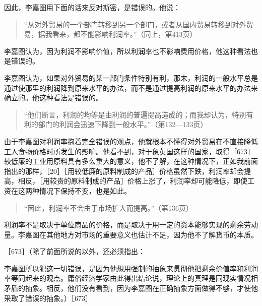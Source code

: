 因此，李嘉图用下面的话来反对斯密，是错误的。他说：

\begin{quote}{“从对外贸易的一个部门转移到另一个部门，或者从国内贸易转移到对外贸易，据我看来，都不能影响利润率。”（同上，第413页）}\end{quote}

李嘉图认为，因为利润不影响价值，所以利润率也不影响费用价格，他这种看法也是错误的。

李嘉图认为，如果对外贸易的某一部门条件特别有利，那末，利润的一般水平总是通过使那里的利润降到原来水平的办法，而不是通过提高利润的原来水平的办法来确立的。他这种看法是错误的。

\begin{quote}{“他们断言，利润的均等是由利润的普遍提高造成的；而我却认为，特别有利的部门的利润会迅速下降到一般水平。”（第132—133页）}\end{quote}

由于李嘉图对利润率抱着完全错误的观点，他就根本不懂得对外贸易在不直接降低工人食物价格时所发生的影响。他看不到，对于象英国这样的国家，取得［673］较低廉的工业用原料具有多么重大的意义，他不了解，在这种情况下，正如我前面指出的那样，［20］［用较低廉的原料制成的产品］价格虽然下跌，利润率却会提高，相反，［用较贵的原料制成的产品］价格上涨了，利润率却可能降低，即使工资在这两种情况下保持不变，也是如此。

\begin{quote}{“因此，利润率不会由于市场扩大而提高。”（第136页）}\end{quote}

利润率不是取决于单位商品的价格，而是取决于用一定的资本能够实现的剩余劳动量。李嘉图在其他地方对市场的重要意义也估计不足，因为他不了解货币的本质。


［673］（除了前面所说的以外，还必须指出：

李嘉图所以犯这一切错误，是因为他想用强制的抽象来贯彻他把剩余价值率和利润率等同起来的观点。庸俗经济学家由此得出结论说，理论上的真理是同现实情况相矛盾的抽象。相反，他们没有看到，因为李嘉图在正确抽象方面做得不够，才使他采取了错误的抽象。）［673］



